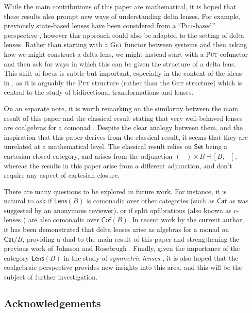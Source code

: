 \documentclass[colorlinks = true, a4paper, oneside, reqno, 11pt]{amsart}
\theoremstyle{definition}
\theoremstyle{remark}
\newcommand{\Set}{\mathsf{Set}}
\newcommand{\Cat}{\mathsf{Cat}}
\newcommand{\Cof}{\mathsf{Cof}}
\newcommand{\Lens}{\mathsf{Lens}}
\begin{document}
While the main contributions of this paper are mathematical, it is 
hoped that these results also prompt new ways of understanding delta 
lenses.
For example, previously state-based lenses have been considered 
from a ``\textsc{Put}-based'' perspective \cite{PHF14, FHP15}, 
however this approach could also be adapted to the setting of delta lenses.  
Rather than starting with a \textsc{Get} functor between systems 
and then asking how we might construct a delta lens, 
we might instead start with a \textsc{Put} cofunctor and then 
ask for ways in which this can be given the structure of a delta lens. 
This shift of focus is subtle but important, 
especially in the context of the ideas in \cite{AU17}, 
as it is arguably the \textsc{Put} structure (rather than the \textsc{Get} 
structure) which is central to the study of bidirectional 
transformations and lenses. 

On an separate note, it is worth remarking on the 
similarity between the main result of this paper
and the classical result stating that very well-behaved lenses are 
coalgebras for a comonad \cite{Con11, GJ12}. 
Despite the clear analogy between them, and the inspiration that this paper 
derives from the classical result, it seems that they are unrelated 
at a mathematical level.
The classical result relies on $\Set$ being a cartesian closed 
category, and arises from the adjunction $(-) \times B \dashv [B, - ]$, 
whereas the results in this paper arise from a different adjunction, 
and don't require any aspect of cartesian closure. 

There are many questions to be explored in future work. 
For instance, it is natural to ask if $\Lens(B)$ is comonadic over other 
categories (such as $\Cat$ as was suggested by an anonymous reviewer), 
or if split opfibrations (also known as c-lenses \cite{JRW12}) are also comonadic 
over $\Cof(B)$. 
In recent work by the current author, it has been demonstrated that delta lenses 
arise as algebras for a monad on $\Cat / B$, 
providing a dual to the main result of this paper and strengthening 
the previous work of Johnson and Rosebrugh \cite{JR13}. 
Finally, given the importance of the category $\Lens(B)$ in the study 
of \emph{symmetric lenses} \cite{JR17, Cla20b}, it is also hoped that 
the coalgebraic perspective provides new insights into this area, 
and this will be the subject of further investigation. 

\subsection*{Acknowledgements}
\end{document}
